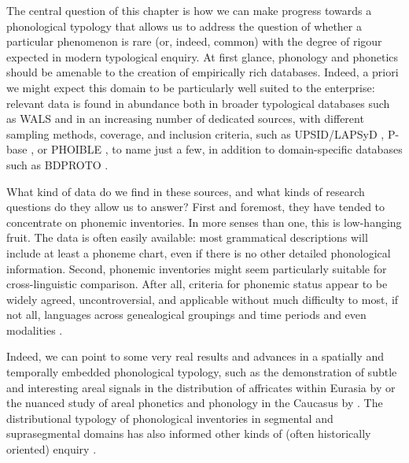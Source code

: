 \documentclass[output=paper,colorlinks,citecolor=brown]{langscibook}
\begin{document}
The central question of this chapter is how we can make progress towards a phonological typology that allows us to address the question of whether a particular phenomenon is rare (or, indeed, common) with the degree of rigour expected in modern typological enquiry. At first glance, phonology and phonetics should be amenable to the creation of empirically rich databases. Indeed, a priori we might expect this domain to be particularly well suited to the enterprise: relevant data is found in abundance both in broader typological databases such as WALS and in an increasing number of dedicated sources, with different sampling methods, coverage, and inclusion criteria, such as UPSID/LAPSyD \parencite{maddieson84:_patter,maddieson89:_updat_upsid, maddieson2013demonstration}, P-base \parencite{mielke-diss}, or PHOIBLE \parencite{phoible}, to name just a few, in addition to domain-specific databases such as BDPROTO \parencite{Moran2020}.

What kind of data do we find in these sources, and what kinds of research questions do they allow us to answer? First and foremost, they have tended to concentrate on phonemic inventories. In more senses than one, this is low-hanging fruit. The data is often easily available: most grammatical descriptions will include at least a phoneme chart, even if there is no other detailed phonological information. Second, phonemic inventories might seem particularly suitable for cross-linguistic comparison. After all, criteria for phonemic status appear to be widely agreed, uncontroversial, and applicable without much difficulty to most, if not all, languages across genealogical groupings and time periods and even modalities \parencite[see, however,][]{kiparsky2017formal}.

Indeed, we can point to some very real results and advances in a spatially and temporally embedded phonological typology, such as the demonstration of subtle and interesting areal signals in the distribution of affricates within Eurasia by \textcite{nikolaev2018areal} or the nuanced study of areal phonetics and phonology in the Caucasus by \textcite{grawunder2017caucasus}. The distributional typology of phonological inventories in segmental and suprasegmental domains has also informed other kinds of (often historically oriented) enquiry \parencite[e.\,g.][]{Atkinson2011,everett2013evidence,everett2015climate,Urban2021}.
\end{document}
